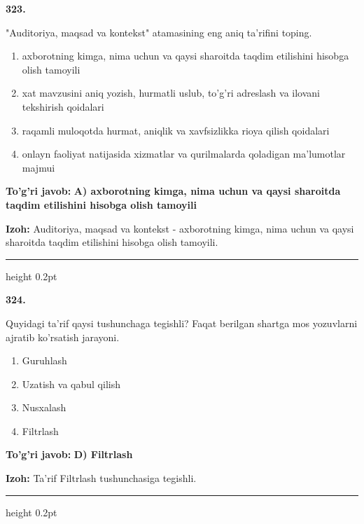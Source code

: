 \documentclass[10pt,a4paper,oneside]{article}
\begin{document}
\noindent\textbf{\color{ink}323.}
\par
"Auditoriya, maqsad va kontekst" atamasining eng aniq ta'rifini toping.
\begin{enumerate}[label=\Alph*),leftmargin=9mm]
\item axborotning kimga, nima uchun va qaysi sharoitda taqdim etilishini hisobga olish tamoyili
\item xat mavzusini aniq yozish, hurmatli uslub, to'g'ri adreslash va ilovani tekshirish qoidalari
\item raqamli muloqotda hurmat, aniqlik va xavfsizlikka rioya qilish qoidalari
\item onlayn faoliyat natijasida xizmatlar va qurilmalarda qoladigan ma'lumotlar majmui
\end{enumerate}
\begin{tcolorbox}[enhanced,breakable,colback=teal!4,colframe=teal!50!black,boxrule=0.5pt,arc=1.1mm,left=3mm,right=3mm,top=1.7mm,bottom=1.7mm,before skip=2mm,after skip=2mm]
\textbf{\color{teal}To'g'ri javob:} \textbf{A) axborotning kimga, nima uchun va qaysi sharoitda taqdim etilishini hisobga olish tamoyili}
\par\smallskip
\textbf{Izoh:} Auditoriya, maqsad va kontekst - axborotning kimga, nima uchun va qaysi sharoitda taqdim etilishini hisobga olish tamoyili.
\end{tcolorbox}
\vspace{2mm}\hrule height 0.2pt \vspace{3mm}

\noindent\textbf{\color{ink}324.}
\par
Quyidagi ta'rif qaysi tushunchaga tegishli? Faqat berilgan shartga mos yozuvlarni ajratib ko'rsatish jarayoni.
\begin{enumerate}[label=\Alph*),leftmargin=9mm]
\item Guruhlash
\item Uzatish va qabul qilish
\item Nusxalash
\item Filtrlash
\end{enumerate}
\begin{tcolorbox}[enhanced,breakable,colback=teal!4,colframe=teal!50!black,boxrule=0.5pt,arc=1.1mm,left=3mm,right=3mm,top=1.7mm,bottom=1.7mm,before skip=2mm,after skip=2mm]
\textbf{\color{teal}To'g'ri javob:} \textbf{D) Filtrlash}
\par\smallskip
\textbf{Izoh:} Ta'rif Filtrlash tushunchasiga tegishli.
\end{tcolorbox}
\vspace{2mm}\hrule height 0.2pt \vspace{3mm}
\end{document}

